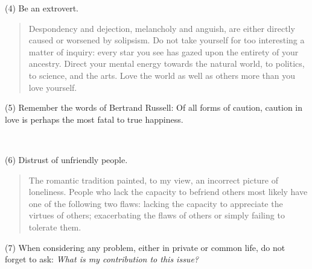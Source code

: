 \documentclass[a4paper, 12pt]{article}
\begin{document}
(4) Be an extrovert.


\small
\begin{quote}

Despondency and dejection, melancholy and anguish, are either directly caused
or worsened by solipsism. Do not take yourself for too interesting a matter of
inquiry: every star you see has gazed upon the entirety of your
ancestry. Direct your mental energy towards the natural world, to politics, to
science, and the arts. Love the world as well as others more than you love
yourself.

\end{quote}
\normalsize

(5) Remember the words of Bertrand Russell: Of all forms of caution, caution in love is perhaps the most fatal to true happiness.

~

(6) Distrust of unfriendly people.


\small
\begin{quote}

The romantic tradition painted, to my view, an incorrect picture of loneliness.
People who lack the capacity to befriend others most likely have one of the
following two flaws: lacking the capacity to appreciate the virtues of others;
exacerbating the flaws of others or simply failing to tolerate them. 


\end{quote}
\normalsize

(7) When considering any problem, either in private or common life, do not
forget to ask: \textit{What is my contribution to this issue?} 
\end{document}
